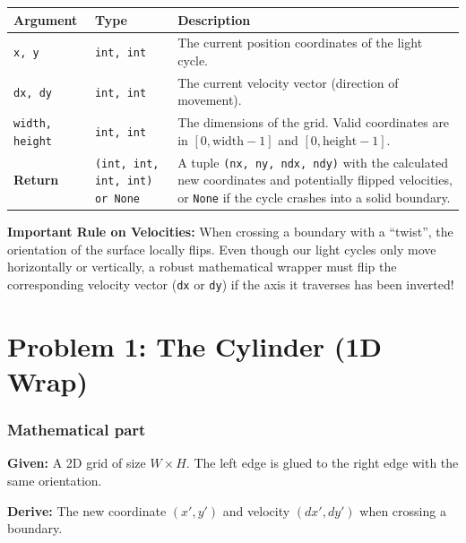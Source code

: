 \documentclass[11pt]{article}
\begin{document}
\vspace{0.5cm}
\begin{center}
\renewcommand{\arraystretch}{1.5}
\begin{tabularx}{\textwidth}{@{} l l X @{}}
\toprule
\textbf{Argument} & \textbf{Type} & \textbf{Description} \\ \midrule
\lstinline|x, y| & \lstinline|int, int| & The current position coordinates of the light cycle. \\
\lstinline|dx, dy| & \lstinline|int, int| & The current velocity vector (direction of movement). \\
\lstinline|width, height| & \lstinline|int, int| & The dimensions of the grid. Valid coordinates are in $[0, \text{width}-1]$ and $[0, \text{height}-1]$. \\ \midrule
\textbf{Return} & \lstinline|(int, int, int, int) or None| & A tuple \lstinline|(nx, ny, ndx, ndy)| with the calculated new coordinates and potentially flipped velocities, or \lstinline|None| if the cycle crashes into a solid boundary. \\
\bottomrule
\end{tabularx}
\end{center}

\noindent \textbf{Important Rule on Velocities:} When crossing a boundary with a ``twist'', the orientation of the surface locally flips. Even though our light cycles only move horizontally or vertically, a robust mathematical wrapper must flip the corresponding velocity vector (\lstinline|dx| or \lstinline|dy|) if the axis it traverses has been inverted!

\newpage

\section*{Problem 1: The Cylinder (1D Wrap)}

\subsubsection*{Mathematical part}
\textbf{Given:} A 2D grid of size $W \times H$. The left edge is glued to the right edge with the same orientation.
\begin{center}
\end{center}
\textbf{Derive:} The new coordinate $(x', y')$ and velocity $(dx', dy')$ when crossing a boundary.
\end{document}
